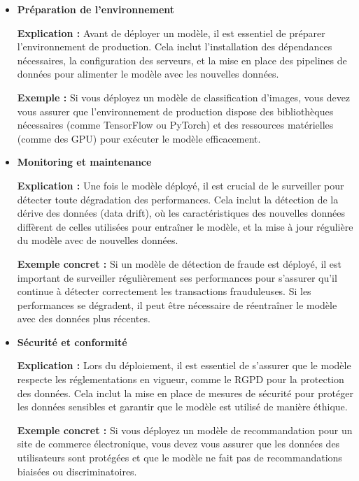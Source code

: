 \documentclass[10pt,a4paper]{article}
\begin{document}
\begin{itemize}
    \item \textbf{Préparation de l'environnement}

    \textbf{Explication :}
    Avant de déployer un modèle, il est essentiel de préparer l'environnement de production. Cela inclut l'installation des dépendances nécessaires, la configuration des serveurs, et la mise en place des pipelines de données pour alimenter le modèle avec les nouvelles données.

    \textbf{Exemple :}
    Si vous déployez un modèle de classification d'images, vous devez vous assurer que l'environnement de production dispose des bibliothèques nécessaires (comme TensorFlow ou PyTorch) et des ressources matérielles (comme des GPU) pour exécuter le modèle efficacement.

    \item \textbf{Monitoring et maintenance}

    \textbf{Explication :}
    Une fois le modèle déployé, il est crucial de le surveiller pour détecter toute dégradation des performances. Cela inclut la détection de la dérive des données (data drift), où les caractéristiques des nouvelles données diffèrent de celles utilisées pour entraîner le modèle, et la mise à jour régulière du modèle avec de nouvelles données.

    \textbf{Exemple concret :}
    Si un modèle de détection de fraude est déployé, il est important de surveiller régulièrement ses performances pour s'assurer qu'il continue à détecter correctement les transactions frauduleuses. Si les performances se dégradent, il peut être nécessaire de réentraîner le modèle avec des données plus récentes.

    \item \textbf{Sécurité et conformité}

    \textbf{Explication :}
    Lors du déploiement, il est essentiel de s'assurer que le modèle respecte les réglementations en vigueur, comme le RGPD pour la protection des données. Cela inclut la mise en place de mesures de sécurité pour protéger les données sensibles et garantir que le modèle est utilisé de manière éthique.

    \textbf{Exemple concret :}
    Si vous déployez un modèle de recommandation pour un site de commerce électronique, vous devez vous assurer que les données des utilisateurs sont protégées et que le modèle ne fait pas de recommandations biaisées ou discriminatoires.
\end{itemize}
\end{document}
